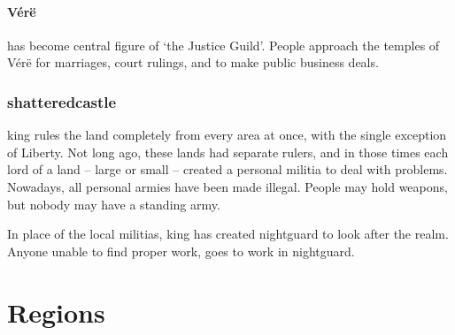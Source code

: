\begin{multicols}{2}
\paragraph{V\'{e}r\"{e}} has become central figure of `the Justice Guild'.
People approach the temples of V\'{e}r\"{e} for marriages, court rulings, and to make public business deals.

\subsubsection{\Gls{shatteredcastle}}

\Gls{king} rules the land completely from every area at once, with the single exception of Liberty.
Not long ago, these lands had separate rulers, and in those times each lord of a land -- large or small -- created a personal militia to deal with problems.
Nowadays, all personal armies have been made illegal.
People may hold weapons, but nobody may have a standing army.

In place of the local militias, \gls{king} has created \gls{nightguard} to look after the realm.
Anyone unable to find proper work, goes to work in \gls{nightguard}.

\end{multicols}

\section{Regions}
\label{encounters}


